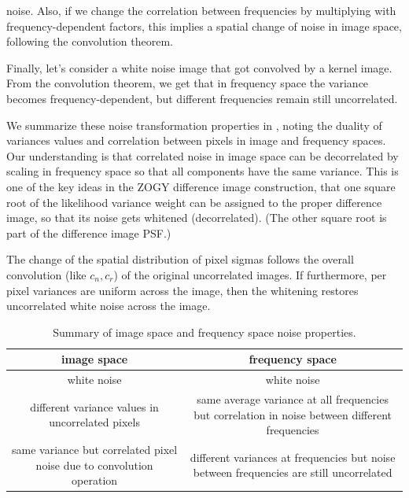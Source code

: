\documentclass[11pt]{article}
\begin{document}
noise. Also, if we change the correlation between frequencies by
multiplying with frequency-dependent factors, this implies a spatial
change of noise in image space, following the convolution
theorem.
%
\par Finally, let's consider a white noise image that got convolved by a kernel
image. From the convolution theorem, we get that in frequency space the
variance becomes frequency-dependent, but different frequencies remain still
uncorrelated.
%
\par We summarize these noise transformation properties in
, noting the duality of variances values and
correlation between pixels in image and frequency spaces. Our understanding
is that correlated noise in image space can be decorrelated by scaling in
frequency space so that all components have the same variance. This is one
of the key ideas in the ZOGY difference image construction, that one square
root of the likelihood variance weight can be assigned to the proper
difference image, so that its noise gets whitened (decorrelated). (The other
square root is part of the difference image PSF.)
%
\par The change of the spatial distribution of pixel sigmas follows the overall
convolution (like \(c_n, c_r\)) of the original uncorrelated images. If
furthermore, per pixel variances are uniform across the image, then the
whitening restores uncorrelated white noise across the image.
%
\begin{table}[h]
\begin{center}
\begin{tabular}{c|c}
  image space & frequency space \\
  \hline
  white noise & white noise \\
  \parbox{3.5in}{different variance values in uncorrelated pixels} &
  \parbox{3.5in}{same average variance at all frequencies
    but correlation in noise between different
    frequencies}
  \\
  \parbox{3.5in}{same variance but correlated pixel noise due to
  convolution operation} & \parbox{3.5in}{different variances at frequencies but
                 noise between frequencies are still uncorrelated} \\
\end{tabular}
\end{center}
\caption{\label{tab:freq_noise}Summary of image space and frequency space
  noise properties.}
\end{table}
%
\end{document}
